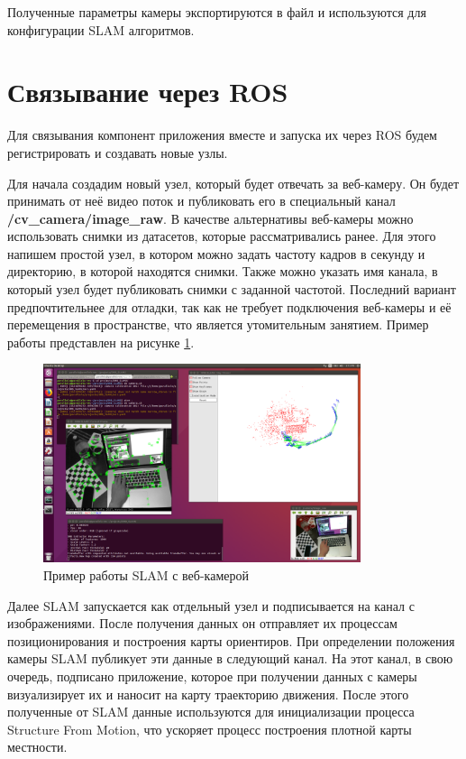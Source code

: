 Полученные параметры камеры экспортируются в файл и используются для конфигурации SLAM алгоритмов.

\section{Связывание через ROS}

Для связывания компонент приложения вместе и запуска их через ROS будем регистрировать и создавать новые узлы. 

Для начала создадим новый узел, который будет отвечать за веб-камеру. Он будет принимать от неё видео поток и публиковать его в специальный канал \textbf{/cv\_camera/image\_raw}. В качестве альтернативы веб-камеры можно использовать снимки из датасетов, которые рассматривались ранее. Для этого напишем простой узел, в котором можно задать частоту кадров в секунду и директорию, в которой находятся снимки. Также можно указать имя канала, в который узел будет публиковать снимки с заданной частотой. Последний вариант предпочтительнее для отладки, так как не требует подключения веб-камеры и её перемещения в пространстве, что является утомительным занятием. Пример работы представлен на рисунке \ref{fig:ros-slam}.

\begin{figure}[h]
    \centering
    \includegraphics[width=0.83\textwidth]{images/ros-slam.png}
    \caption{Пример работы SLAM с веб-камерой}
    \label{fig:ros-slam}
\end{figure}

Далее SLAM запускается как отдельный узел и подписывается на канал с изображениями. После получения данных он отправляет их процессам позиционирования и построения карты ориентиров. При определении положения камеры SLAM публикует эти данные в следующий канал. На этот канал, в свою очередь, подписано приложение, которое при получении данных с камеры визуализирует их и наносит на карту траекторию движения. После этого полученные от SLAM данные используются для инициализации процесса Structure From Motion, что ускоряет процесс построения плотной карты местности.

